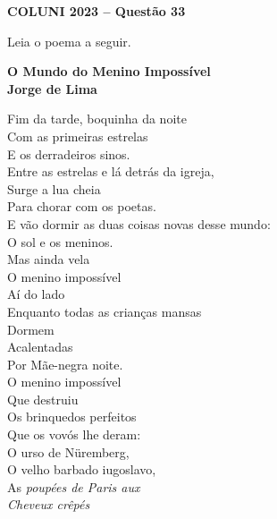 \textbf{COLUNI 2023 -- Questão 33}\par\medskip Leia o poema a seguir.

\begin{center}
\textbf{O Mundo do Menino Impossível}\\
\textbf{Jorge de Lima}
\end{center}

\noindent
\begin{minipage}[t]{0.32\linewidth}
Fim da tarde, boquinha da noite\\
Com as primeiras estrelas\\
E os derradeiros sinos.\\[0.6em]
Entre as estrelas e lá detrás da igreja,\\
Surge a lua cheia\\
Para chorar com os poetas.\\[0.6em]
E vão dormir as duas coisas novas desse mundo:\\
O sol e os meninos.\\[0.6em]
Mas ainda vela\\
O menino impossível\\
Aí do lado\\
Enquanto todas as crianças mansas\\
Dormem\\
Acalentadas\\
Por Mãe-negra noite.\\[0.6em]
O menino impossível\\
Que destruiu\\
Os brinquedos perfeitos\\
Que os vovós lhe deram:\\
O urso de Nüremberg,\\
O velho barbado iugoslavo,\\
As \textit{poupées de Paris aux}\\
\textit{Cheveux crêpés}
\end{minipage}\hfill
